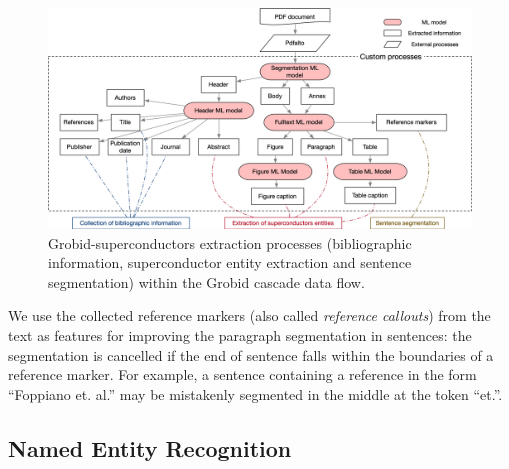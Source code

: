 \begin{figure}[ht]
    \includegraphics[width=\textwidth]{figures/automatic_extraction_supercon/document-structuring-colors}
    \caption{Grobid-superconductors extraction processes (bibliographic information, superconductor entity extraction and sentence segmentation) within the Grobid cascade data flow.}
    \label{fig:grobid-document-processing}
\end{figure}

We use the collected reference markers (also called \textit{reference callouts}) from the text as features for improving the paragraph segmentation in sentences: the segmentation is cancelled if the end of sentence falls within the boundaries of a reference marker.
For example, a sentence containing a reference in the form ``Foppiano et. al.'' may be mistakenly segmented in the middle at the token ``et.''.



\subsection{Named Entity Recognition}
\label{subsubsec:extraction}

